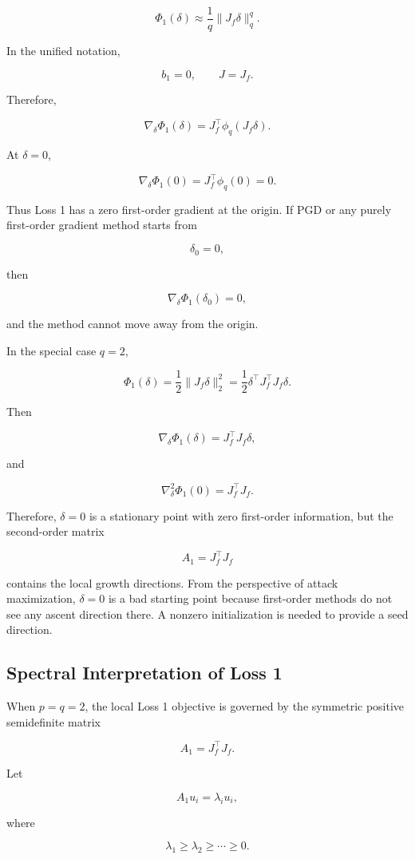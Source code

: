 \documentclass{article}
\begin{document}
\[
\Phi_1(\delta)
\approx
\frac{1}{q}\|J_f\delta\|_q^q.
\]

In the unified notation,

\[
b_1=0,
\qquad
J=J_f.
\]

Therefore,

\[
\nabla_\delta \Phi_1(\delta)
=
J_f^\top\phi_q(J_f\delta).
\]

At \(\delta=0\),

\[
\nabla_\delta \Phi_1(0)
=
J_f^\top\phi_q(0)
=
0.
\]

Thus Loss 1 has a zero first-order gradient at the origin. If PGD or any purely first-order gradient method starts from

\[
\delta_0=0,
\]

then

\[
\nabla_\delta \Phi_1(\delta_0)=0,
\]

and the method cannot move away from the origin.

In the special case \(q=2\),

\[
\Phi_1(\delta)
=
\frac{1}{2}\|J_f\delta\|_2^2
=
\frac{1}{2}\delta^\top J_f^\top J_f\delta.
\]

Then

\[
\nabla_\delta \Phi_1(\delta)
=
J_f^\top J_f\delta,
\]

and

\[
\nabla_\delta^2\Phi_1(0)
=
J_f^\top J_f.
\]

Therefore, \(\delta=0\) is a stationary point with zero first-order information, but the second-order matrix

\[
A_1=J_f^\top J_f
\]

contains the local growth directions. From the perspective of attack maximization, \(\delta=0\) is a bad starting point because first-order methods do not see any ascent direction there. A nonzero initialization is needed to provide a seed direction.

\subsection{Spectral Interpretation of Loss 1}

When \(p=q=2\), the local Loss 1 objective is governed by the symmetric positive semidefinite matrix

\[
A_1=J_f^\top J_f.
\]

Let

\[
A_1u_i=\lambda_i u_i,
\]

where

\[
\lambda_1\ge \lambda_2\ge \cdots \ge 0.
\]
\end{document}
